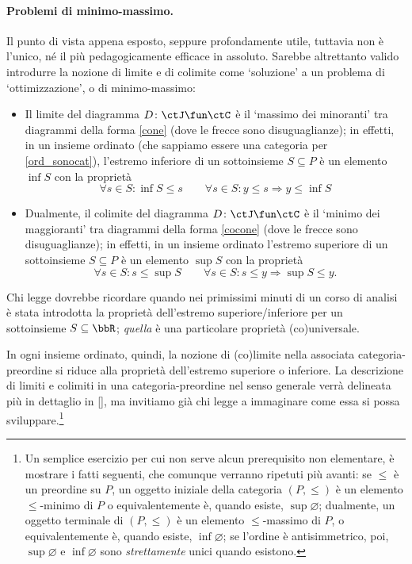 \paragraph*{Problemi di minimo-massimo.}
Il punto di vista appena esposto, seppure profondamente utile, tuttavia non è l'unico, né il più pedagogicamente efficace in assoluto. Sarebbe altrettanto valido introdurre la nozione di limite e di colimite come `soluzione' a un problema di `ottimizzazione', o di minimo-massimo:
\begin{itemize}
	\item Il limite del diagramma \(D \colon \ctJ\fun\ctC\) è il `massimo dei minoranti' tra diagrammi della forma \eqref{cone} (dove le frecce sono disuguaglianze); in effetti, in un insieme ordinato (che sappiamo essere una categoria per \ref{ord_sonocat}), l'estremo inferiore di un sottoinsieme \(S\subseteq P\) è un elemento \(\inf S\) con la proprietà
	      \[\forall s\in S : \inf S \le s\qquad \forall s\in S : y\le s \Rightarrow y\le \inf S\]
	\item Dualmente, il colimite del diagramma \(D \colon \ctJ\fun\ctC\) è il `minimo dei maggioranti' tra diagrammi della forma \eqref{cocone} (dove le frecce sono disuguaglianze); in effetti, in un insieme ordinato l'estremo superiore di un sottoinsieme \(S\subseteq P\) è un elemento \(\sup S\) con la proprietà
	      \[\forall s\in S : s\le\sup S \qquad \forall s\in S : s\le y \Rightarrow \sup S\le y.\]
\end{itemize}
\begin{remark}
	Chi legge dovrebbe ricordare quando nei primissimi minuti di un corso di analisi è stata introdotta la proprietà dell'estremo superiore/inferiore per un sottoinsieme \(S\subseteq\bbR\); \emph{quella} è una particolare proprietà (co)universale.
\end{remark}
In ogni insieme ordinato, quindi, la nozione di (co)limite nella associata categoria-preordine si riduce alla proprietà dell'estremo superiore	o inferiore. La descrizione di limiti e colimiti in una categoria-preordine nel senso generale verrà delineata più in dettaglio in \ref{}, ma invitiamo già chi legge a immaginare come essa si possa sviluppare.\footnote{Un semplice esercizio per cui non serve alcun prerequisito	non elementare, è mostrare i fatti seguenti, che comunque verranno ripetuti più avanti: se \(\le\) è un preordine su \(P\), un oggetto iniziale della categoria \((P,\le)\) è un elemento \(\le\)-minimo di \(P\) o equivalentemente è, quando esiste, \(\sup \varnothing\); dualmente, un oggetto terminale di \((P,\le)\) è un elemento \(\le\)-massimo di \(P\), o equivalentemente è, quando esiste, \(\inf\varnothing\); se l'ordine è antisimmetrico, poi, \(\sup\varnothing\) e \(\inf\varnothing\) sono \emph{strettamente} unici quando esistono.}

